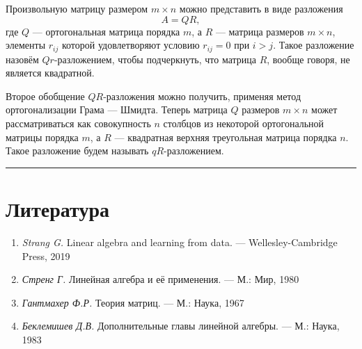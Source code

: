 \documentclass[11pt,a4paper]{article}
\renewcommand{\linethickness}{0.1ex}
\providecommand{\tightlist}{%
      \setlength{\itemsep}{0pt}\setlength{\parskip}{0pt}}
\begin{document}
Произвольную матрицу размером \(m \times n\) можно представить в виде
разложения \[
  A = QR,
\] где \(Q\) --- ортогональная матрица порядка \(m\), а \(R\) ---
матрица размеров \(m \times n\), элементы \(r_{ij}\) которой
удовлетворяют условию \(r_{ij}=0\) при \(i>j\). Такое разложение назовём
\(Qr\)-разложением, чтобы подчеркнуть, что матрица \(R\), вообще говоря,
не является квадратной.

Второе обобщение \(QR\)-разложения можно получить, применяя метод
ортогонализации Грама --- Шмидта. Теперь матрица \(Q\) размеров
\(m \times n\) может рассматриваться как совокупность \(n\) столбцов из
некоторой ортогональной матрицы порядка \(m\), а \(R\) --- квадратная
верхняя треугольная матрица порядка \(n\). Такое разложение будем
называть \(qR\)-разложением.

    \begin{center}\rule{0.5\linewidth}{\linethickness}\end{center}

    \hypertarget{ux43bux438ux442ux435ux440ux430ux442ux443ux440ux430}{%
\section{Литература}\label{ux43bux438ux442ux435ux440ux430ux442ux443ux440ux430}}

\begin{enumerate}
\def\labelenumi{\arabic{enumi}.}
\tightlist
\item
  \emph{Strang G.} Linear algebra and learning from data. ---
  Wellesley-Cambridge Press, 2019
\item
  \emph{Стренг Г.} Линейная алгебра и её применения. --- М.: Мир, 1980
\item
  \emph{Гантмахер Ф.Р.} Теория матриц. --- М.: Наука, 1967
\item
  \emph{Беклемишев Д.В.} Дополнительные главы линейной алгебры. --- М.:
  Наука, 1983
\end{enumerate}


    
    
    
\end{document}

